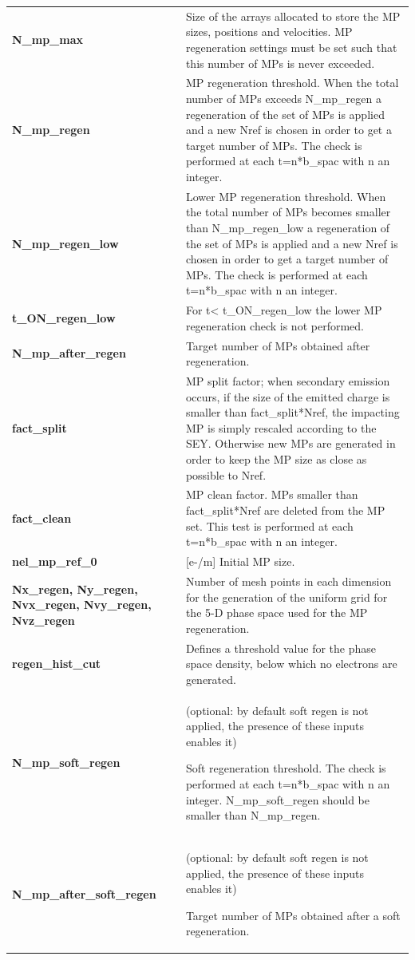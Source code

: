 \documentclass[a4paper,12pt]{article}
\begin{document}
\begin{longtable}{p{}p{}}
\hline\endfirsthead\hline\endhead\rowcolor{Gray}
\multicolumn{2}{p{.97\textwidth}}{
\textbf{MP management settings}
}\\ \hline
\textbf{N\_mp\_max}&	Size of the arrays allocated to store the MP sizes, positions and velocities. MP regeneration settings must be set such that this number of MPs is never exceeded.\\ \hline
\textbf{N\_mp\_regen}& 	MP regeneration threshold. When the total number of MPs exceeds N\_mp\_regen a regeneration of the set of MPs is applied and a new Nref is chosen in order to get a target number of MPs. The check is performed at each t=n*b\_spac with n an integer.\\ \hline 
\textbf{N\_mp\_regen\_low}&	Lower MP regeneration threshold. When the total number of MPs becomes smaller than N\_mp\_regen\_low a regeneration of the set of MPs is applied and a new Nref is chosen in order to get a target number of MPs. The check is performed at each t=n*b\_spac with n an integer.\\ \hline
\textbf{t\_ON\_regen\_low}&	For t< t\_ON\_regen\_low the lower MP regeneration check is not performed.\\ \hline
\textbf{N\_mp\_after\_regen}&	Target number of MPs obtained after regeneration.\\ \hline
\textbf{fact\_split}&	MP split factor; when secondary emission occurs, if the size of the emitted charge is smaller than fact\_split*Nref, the impacting MP is simply rescaled according to the SEY. Otherwise new MPs are generated in order to keep the MP size as close as possible to Nref.\\ \hline
\textbf{fact\_clean}&	MP clean factor. MPs smaller than fact\_split*Nref are deleted from the MP set. This test is performed at each t=n*b\_spac with n an integer.\\ \hline
\textbf{nel\_mp\_ref\_0}&	[e-/m] Initial MP size.\\ \hline
\textbf{Nx\_regen, Ny\_regen, Nvx\_regen, Nvy\_regen, Nvz\_regen}&	Number of mesh points in each dimension for the generation of the uniform grid for the 5-D phase space used for the MP regeneration.\\ \hline
\textbf{regen\_hist\_cut}&	Defines a threshold value for the phase space density, below which no electrons are generated.\\ \hline
\textbf{N\_mp\_soft\_regen}&	(optional: by default soft regen is not applied, the presence of these inputs enables it) 

Soft regeneration threshold. The check is performed at each t=n*b\_spac with n an integer. N\_mp\_soft\_regen should be smaller than N\_mp\_regen.\\ \hline
\textbf{N\_mp\_after\_soft\_regen}&	(optional: by default soft regen is not applied, the presence of these inputs enables it) 

Target number of MPs obtained after a soft regeneration.\\ 
\hline
\end{longtable}
\end{document}
